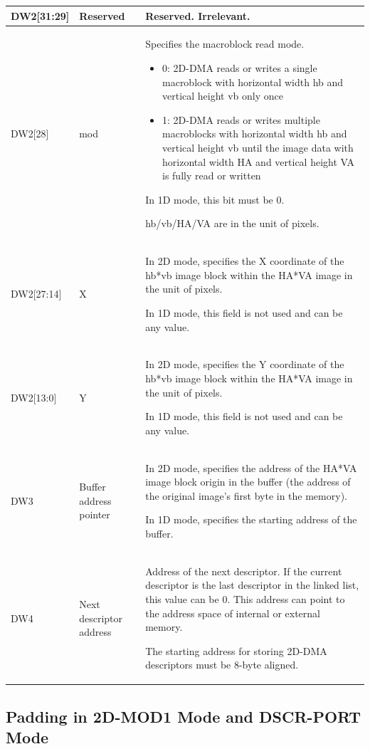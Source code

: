 \documentclass[main\_\_EN.tex]{subfiles}
\begin{document}
\begin{longtable}[c]{|m{1.8cm}|m{2.5cm}|L{10.2cm}|}
DW2[31:29] & Reserved & Reserved. Irrelevant. \\\hline
DW2[28] & mod & Specifies the macroblock read mode.
    \begin{itemize}
        \item 0: 2D-DMA reads or writes a single macroblock with horizontal width hb and vertical height vb only once
        \item 1: 2D-DMA reads or writes multiple macroblocks with horizontal width hb and vertical height vb until the image data with horizontal width HA and vertical height VA is fully read or written
    \end{itemize}
    In 1D mode, this bit must be 0.
    \begin{tiplisting}
        hb/vb/HA/VA are in the unit of pixels.
    \end{tiplisting}
    \\\hline
DW2[27:14] & X & In 2D mode, specifies the X coordinate of the hb*vb image block within the HA*VA image in the unit of pixels.

    In 1D mode, this field is not used and can be any value. \\\hline
DW2[13:0] & Y & In 2D mode, specifies the Y coordinate of the hb*vb image block within the HA*VA image in the unit of pixels.

    In 1D mode, this field is not used and can be any value. \\\hline

DW3 & Buffer address pointer & In 2D mode, specifies the address of the HA*VA image block origin in the buffer (the address of the original image's first byte in the memory).

    In 1D mode, specifies the starting address of the buffer. \\\hline

DW4 & Next descriptor address & Address of the next descriptor. If the current descriptor is the last descriptor in the linked list, this value can be 0. This address can point to the address space of internal or external memory.
    \begin{tiplisting}
        The starting address for storing 2D-DMA descriptors must be 8-byte aligned.
    \end{tiplisting}
    \\\hline
\end{longtable}




\subsection{Padding in 2D-MOD1 Mode and DSCR-PORT Mode}
\end{document}

